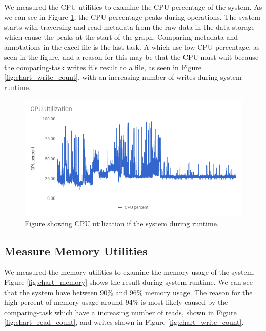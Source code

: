 \documentclass[USenglish]{uit-thesis}
\begin{document}
We measured the CPU utilities to examine the CPU percentage of the system. As we can see in Figure \ref{fig:chart_cpu}, the CPU percentage peaks during operations. The system starts with traversing and read metadata from the raw data in the data storage which cause the peaks at the start of the graph. Comparing metadata and annotations in the excel-file is the last task. A which use low CPU percentage, as seen in the figure, and a reason for this may be that the CPU must wait because the comparing-task writes it's result to a file, as seen in Figure \ref{fig:chart_write_count}, with an increasing number of writes during system runtime.

\begin{figure}
\centering
\includegraphics[width=\textwidth]{chart_cpu.png}
\caption{Figure showing CPU utilization if the system during runtime.}
\label{fig:chart_cpu}
\end{figure}


\subsection{Measure Memory Utilities} \label{sec:eva_mem}

We measured the memory utilities to examine the memory usage of the system. Figure \ref{fig:chart_memory} shows the result during system runtime. We can see that the system have between 90\% and 96\% memory usage.
The reason for the high percent of memory usage around 94\% is most likely caused by the comparing-task which have a increasing number of reads, shown in Figure \ref{fig:chart_read_count}, and writes shown in Figure \ref{fig:chart_write_count}.
\end{document}
